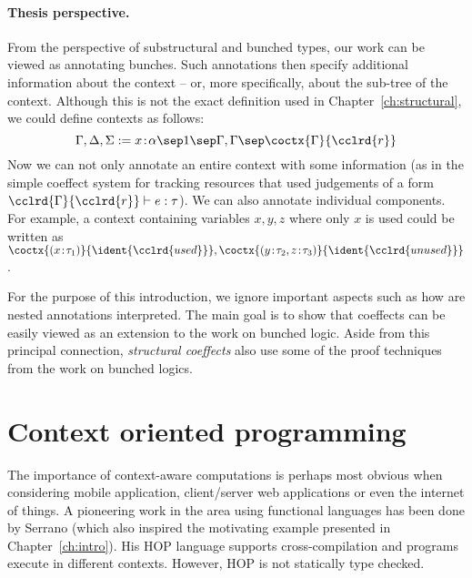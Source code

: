 \paragraph{Thesis perspective.}

From the perspective of substructural and bunched types, our work can be viewed as annotating
bunches. Such annotations then specify additional information about the context -- or, more
specifically, about the sub-tree of the context. Although this is not the exact definition used in
Chapter~\ref{ch:structural}, we could define contexts as follows:
%
\begin{equation*}
\Gamma, \Delta, \Sigma := x\!:\!\alpha \sep 1 \sep \Gamma, \Gamma \sep \coctx{\Gamma}{\cclrd{r}}
\end{equation*}
%
Now we can not only annotate an entire context with some information (as in the simple coeffect
system for tracking resources that used judgements of a form $\cclrd{\Gamma}{\cclrd{r}} \vdash e : \tau$).
We can also annotate individual components. For example, a context containing variables $x,y,z$
where only $x$ is used could be written as $\coctx{(x\!:\!\tau_1)}{\ident{\cclrd{used}}}, \coctx{(y\!:\!\tau_2, z\!:\!\tau_3)}{\ident{\cclrd{unused}}}$.

For the purpose of this introduction, we ignore important aspects such as how are nested annotations
interpreted. The main goal is to show that coeffects can be easily viewed as an extension to the
work on bunched logic. Aside from this principal connection, \emph{structural coeffects} also
use some of the proof techniques from the work on bunched logics.



%
%

\section{Context oriented programming}

The importance of context-aware computations is perhaps most obvious when considering mobile
application, client/server web applications or even the internet of things. A pioneering work
in the area using functional languages has been done by Serrano \cite{app-hop-diffuse,app-hop-lang}
(which also inspired the motivating example presented in Chapter~\ref{ch:intro}). His HOP language supports
cross-compilation and programs execute in different contexts. However, HOP is not statically
type checked.

